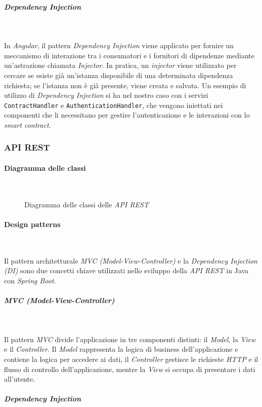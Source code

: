 \subparagraph*{Dependency Injection}~

\noindent In \textit{Angular}, il pattern \textit{Dependency Injection} viene applicato per fornire un meccanismo di interazione tra i consumatori e i fornitori di dipendenze mediante un'astrazione chiamata \textit{Injector}. In pratica, un \textit{injector} viene utilizzato per cercare se esiste già un'istanza disponibile di una determinata dipendenza richiesta; se l'istanza non è già presente, viene creata e salvata. Un esempio di utilizzo di \textit{Dependency Injection} si ha nel nostro caso con i servizi \texttt{ContractHandler} e \texttt{AuthenticationHandler}, che vengono iniettati nei componenti che li necessitano per gestire l'autenticazione e le interazioni con lo \textit{smart contract}.

\subsubsection{API REST}
\paragraph{Diagramma delle classi}~
\begin{figure}[H]
    
    \caption{Diagramma delle classi delle \textit{API REST}}\label{fig:apirest}
\end{figure}

\paragraph{Design patterns}~

\noindent Il pattern architetturale \textit{MVC (Model-View-Controller)} e la \textit{Dependency Injection (DI)} sono due concetti chiave utilizzati nello sviluppo della \textit{API REST} in Java con \textit{Spring Boot}.

\subparagraph*{MVC (Model-View-Controller)}~

\noindent Il pattern \textit{MVC} divide l'applicazione in tre componenti distinti: il \textit{Model}, la \textit{View} e il \textit{Controller}. Il \textit{Model} rappresenta la logica di business dell'applicazione e contiene la logica per accedere ai dati, il \textit{Controller} gestisce le richieste \textit{HTTP} e il flusso di controllo dell'applicazione, mentre la \textit{View} si occupa di presentare i dati all'utente.

\subparagraph*{Dependency Injection}~

